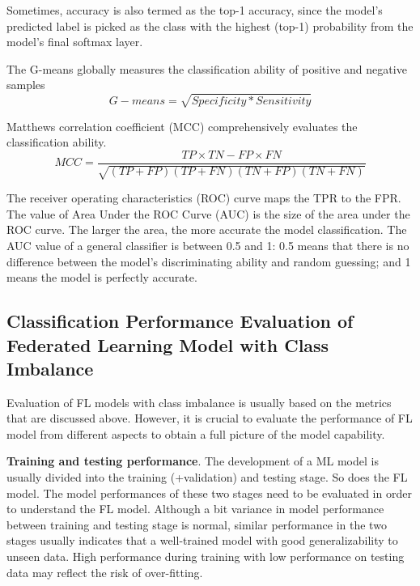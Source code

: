\documentclass[10pt,journal,compsoc]{IEEEtran}
\begin{document}
Sometimes, accuracy is also termed as the top-1 accuracy, since the model's predicted label is picked as the class with the highest (top-1) probability from the model's final softmax layer. 

The G-means globally measures the classification ability of positive and negative samples
\vspace{-0.2cm}
\begin{equation}
G-means=\sqrt{Specificity \ast  Sensitivity}
\end{equation}

Matthews correlation coefficient (MCC) comprehensively evaluates the classification ability.
\vspace{-0.1cm}
\begin{equation}
MCC=\frac{TP \times TN-FP \times FN}{\sqrt{(TP+FP)(TP+FN)(TN+FP)(TN+FN)}}
\end{equation}

The receiver operating characteristics (ROC) curve maps the TPR to the FPR. The value of Area Under the ROC Curve (AUC) is the size of the area under the ROC curve. The larger the area, the more accurate the model classification. The AUC value of a general classifier is between 0.5 and 1: 0.5 means that there is no difference between the model's discriminating ability and random guessing; and 1 means the model is perfectly accurate. 
\vspace{-0.2cm}

\subsection{Classification Performance Evaluation of Federated Learning Model with Class Imbalance}
Evaluation of FL models with class imbalance is usually based on the metrics that are discussed above. However, it is crucial to evaluate the performance of FL model from different aspects to obtain a full picture of the model capability.  

\textbf{Training and testing performance}. The development of a ML model is usually divided into the training  (+validation) and testing stage. So does the FL model. The model performances of these two stages need to be evaluated in order to understand the FL model. Although a bit variance in model performance between training and testing stage is normal, similar performance in the two stages usually indicates that a well-trained model with good generalizability to unseen data. High performance during training with low performance on testing data may reflect the risk of over-fitting.  
\end{document}
